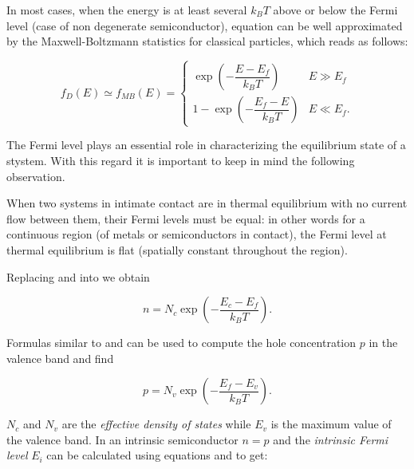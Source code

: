 In most cases, when the energy is at least several $k_BT$ above or below the Fermi level (case of non degenerate semiconductor), equation  can be well approximated by the Maxwell-Boltzmann statistics for classical particles, which reads as follows:

\begin{equation}
\label{eq: maxwell distribution}
f_D(E)\simeq f_{MB}(E) = 
\begin{cases}
\exp\left(-\dfrac{E-E_f}{k_B T}\right) & E\gg E_f \\
1-\exp\left(-\dfrac{E_f-E}{k_BT}\right) & E \ll E_f .
\end{cases}
\end{equation}

The Fermi level plays an essential role in characterizing the equilibrium state of a stystem. With this regard it is important to keep in mind the following observation.

\begin{Osservazione}
When two systems in intimate contact are in thermal equilibrium with no current flow between them, their Fermi levels must be equal: in other words for a continuous region (of metals or semiconductors in contact), the Fermi level at thermal equilibrium is flat (spatially constant throughout the region).
\end{Osservazione}

Replacing  and  into  we obtain

\begin{equation}
n = N_c \exp\left(-\dfrac{E_c-E_f}{k_BT}\right). \label{eq: n density fd}
\end{equation}

Formulas similar to  and  can be used to compute the hole concentration $p$ in the valence band and find

\begin{equation}
p = N_v \exp\left(-\dfrac{E_f-E_v}{k_B T}\right).  \label{eq: p density fd}
\end{equation}

$N_c$ and $N_v$ are the \textit{effective density of states} while $E_v$ is the maximum value of the valence band.
In an intrinsic semiconductor $n=p$ and the \textit{intrinsic Fermi level} $E_i$ can be calculated using equations  and  to get:


